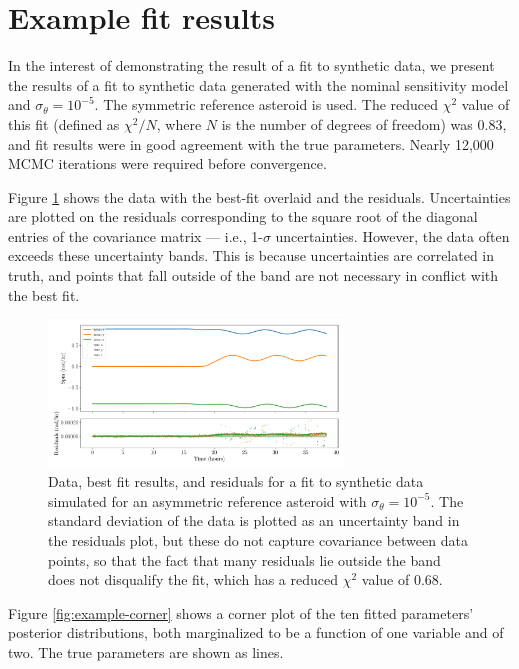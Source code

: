 \documentclass{aastex631}
\begin{document}
\section{Example fit results}
In the interest of demonstrating the result of a fit to synthetic data, we present the results of a fit to synthetic data generated with the nominal sensitivity model and $\sigma_\theta = 10^{-5}$. The symmetric reference asteroid is used. The reduced $\chi^2$ value of this fit (defined as $\chi^2 / N$, where $N$ is the number of degrees of freedom) was 0.83, and fit results were in good agreement with the true parameters. Nearly 12,000 MCMC iterations were required before convergence.

Figure \ref{fig:example-residuals} shows the data with the best-fit overlaid and the residuals. Uncertainties are plotted on the residuals corresponding to the square root of the diagonal entries of the covariance matrix --- i.e., 1-$\sigma$ uncertainties. However, the data often exceeds these uncertainty bands. This is because uncertainties are correlated in truth, and points that fall outside of the band are not necessary in conflict with the best fit.

\begin{figure}
  \centering
  \includegraphics[width=0.7\textwidth]{example-residuals.pdf}
  \caption{Data, best fit results, and residuals for a fit to synthetic data simulated for an asymmetric reference asteroid with $\sigma_\theta = 10^{-5}$. The standard deviation of the data is plotted as an uncertainty band in the residuals plot, but these do not capture covariance between data points, so that the fact that many residuals lie outside the band does not disqualify the fit, which has a reduced $\chi^2$ value of 0.68.}
  \label{fig:example-residuals}
\end{figure}

Figure \ref{fig:example-corner} shows a corner plot of the ten fitted parameters' posterior distributions, both marginalized to be a function of one variable and of two. The true parameters are shown as lines.
\end{document}

